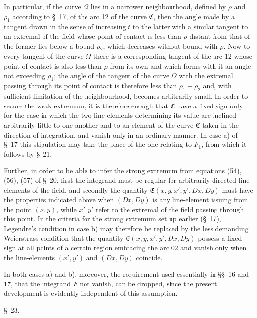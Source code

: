 \documentclass[11pt,a4paper,leqno]{article}
\begin{document}
In particular, if the curve $\Omega$ lies in a narrower neighbourhood, defined by $\rho$ and $\rho_1$ according to \S~17, of the arc 12 of the curve $\mathfrak{C}$, then the angle made by a tangent drawn in the sense of increasing $t$ to the latter with a similar tangent to an extremal of the field whose point of contact is less than $\rho$ distant from that of the former lies below a bound $\rho_2$, which decreases without bound with $\rho$. Now to every tangent of the curve $\Omega$ there is a corresponding tangent of the arc 12 whose point of contact is also less than $\rho$ from its own and which forms with it an angle not exceeding $\rho_1$; the angle of the tangent of the curve $\Omega$ with the extremal passing through its point of contact is therefore less than $\rho_1+\rho_2$ and, with sufficient limitation of the neighbourhood, becomes arbitrarily small. In order to secure the weak extremum, it is therefore enough that $\mathfrak{E}$ have a fixed sign only for the case in which the two line-elements determining its value are inclined arbitrarily little to one another and to an element of the curve $\mathfrak{C}$ taken in the direction of integration, and vanish only in an ordinary manner. In case a) of \S~17 this stipulation may take the place of the one relating to $F_1$, from which it follows by \S~21.

Further, in order to be able to infer the strong extremum from equations (54), (56), (57) of \S~20, first the integrand must be regular for arbitrarily directed line-elements of the field, and secondly the quantity $\mathfrak{E}(x,y,x',y',D x,D y)$ must have the properties indicated above when $(D x,D y)$ is any line-element issuing from the point $(x,y)$, while $x',y'$ refer to the extremal of the field passing through this point. In the criteria for the strong extremum set up earlier (\S~17), Legendre's condition in case b) may therefore be replaced by the less demanding Weierstrass condition that the quantity $\mathfrak{E}(x,y,x',y',D x,D y)$ possess a fixed sign at all points of a certain region embracing the arc 02 and vanish only when the line-elements $(x',y')$ and $(D x,D y)$ coincide.

In both cases a) and b), moreover, the requirement used essentially in \S\S~16 and 17,
that the integrand $F$ not vanish, can be dropped, since the present development is evidently independent of this assumption.

\begin{center}{\large \S~23.}\end{center}
\end{document}
